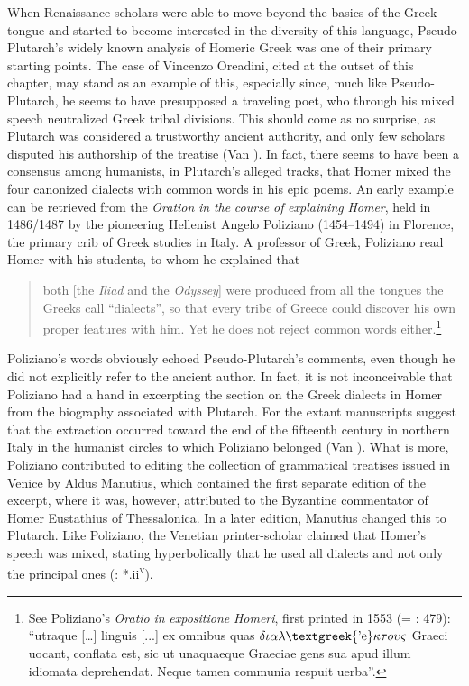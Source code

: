 When Renaissance scholars were able to move beyond the basics of the Greek tongue and started to become interested in the diversity of this language, Pseudo-Plutarch’s widely known analysis of Homeric Greek was one of their primary starting points. The case of Vincenzo Oreadini, cited at the outset of this chapter, may stand as an example of this, especially since, much like Pseudo-Plutarch, he seems to have presupposed a traveling poet, who through his mixed speech neutralized Greek tribal divisions. This should come as no surprise, as Plutarch was considered a trustworthy ancient authority, and only few scholars disputed his authorship of the treatise (Van \citealt{Rooy2018c}). In fact, there seems to have been a consensus among humanists, in Plutarch’s alleged tracks, that Homer mixed the four canonized dialects with common words in his epic poems. An early example can be retrieved from the \textit{Oration} \textit{in} \textit{the} \textit{course} \textit{of} \textit{explaining} \textit{Homer}, held in 1486/1487 by the pioneering Hellenist Angelo Poliziano (1454–1494) in Florence, the primary crib of Greek studies in Italy. A professor of Greek, Poliziano read Homer with his students, to whom he explained that

\begin{quote}
both [the \textit{Iliad} and the \textit{Odyssey}] were produced from all the tongues the Greeks call “dialects”, so that every tribe of Greece could discover his own proper features with him. Yet he does not reject common words either.\footnote{See Poliziano’s \textit{Oratio} \textit{in} \textit{expositione} \textit{Homeri}, first printed in 1553 (= \citealt{Poliziano1553}: 479): “utraque […] linguis [...] ex omnibus quas $\delta \iota \alpha \lambda \text{\textgreek{'e}}\kappa \tau o\upsilon \varsigma $ Graeci uocant, conflata est, sic ut unaquaeque Graeciae gens sua apud illum idiomata deprehendat. Neque tamen communia respuit uerba”.}
\end{quote}

Poliziano’s words obviously echoed Pseudo-Plutarch’s comments, even though he did not explicitly refer to the ancient author. In fact, it is not inconceivable that Poliziano had a hand in excerpting the section on the Greek dialects in Homer from the biography associated with Plutarch. For the extant manuscripts suggest that the extraction occurred toward the end of the fifteenth century in northern Italy in the humanist circles to which Poliziano belonged (Van \citealt{Rooy2018c}). What is more, Poliziano contributed to editing the collection of grammatical treatises issued in Venice by Aldus Manutius, which contained the first separate edition of the excerpt, where it was, however, attributed to the Byzantine commentator of Homer Eustathius of Thessalonica. In a later edition, Manutius changed this to Plutarch. Like Poliziano, the Venetian printer-scholar claimed that Homer’s speech was mixed, stating hyperbolically that he used all dialects and not only the principal ones (\citealt{Manutius1496}: *.ii\textsc{\textsuperscript{v}}).

